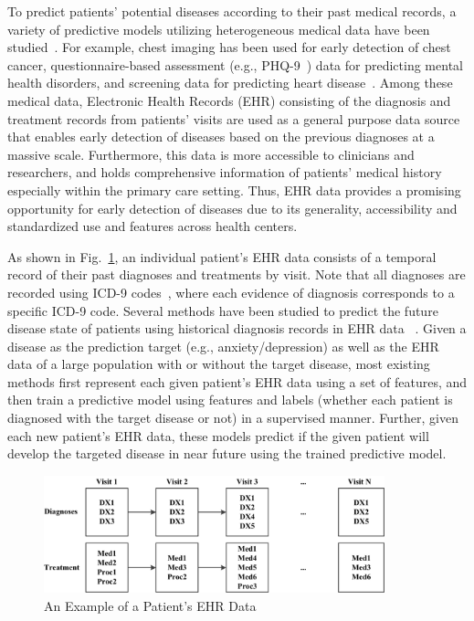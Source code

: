 To predict patients' potential diseases according to their past medical records, a variety of predictive models utilizing heterogeneous medical data have been studied~\cite{soni2011predictive,palaniappan2008intelligent,kumari2011comparative}. For example,  chest imaging has been used for early detection of chest cancer, questionnaire-based assessment (e.g., PHQ-9~\cite{kroenke2002phq}) data for predicting mental health disorders, and screening data for predicting heart disease~\cite{d2001validation}. Among these medical data, Electronic Health Records (EHR) consisting of the diagnosis and treatment records from patients' visits are used as a general purpose data source that enables early detection of diseases based on the previous diagnoses at a massive scale. Furthermore, this data is more accessible to clinicians and researchers, and holds comprehensive information of patients' medical history especially within the primary care setting. Thus, EHR data provides a promising opportunity for  early detection of diseases due to its generality, accessibility and standardized use and features across health centers.
 

As shown in Fig.~\ref{fig:exp-ehr}, an individual patient's EHR data consists of a temporal record of their past diagnoses and treatments by visit. Note that all diagnoses are recorded using ICD-9 codes~\cite{dubberke2006icd}, where each evidence of diagnosis corresponds to a specific ICD-9 code. Several methods have been studied to predict the future disease state of patients using historical diagnosis records in EHR data ~\cite{personalized2015,amarasingham2010automated,pittman2004integrated,jensen2012mining}. Given a disease as the prediction target (e.g., anxiety/depression) as well as the EHR data of a large population with or without the target disease, most existing methods first represent each given patient's EHR data using a set of features, and then train a predictive model using features and labels (whether each patient is diagnosed with the target disease or not) in a supervised manner. Further, given each new patient's EHR data, these models predict if the given patient will develop the targeted disease in near future using the trained predictive model.
 

\begin{figure}
\centering
\includegraphics[width=0.88\textwidth]{./img/Patient.png}
\caption{An Example of a Patient's EHR Data}
\label{fig:exp-ehr}
\end{figure}


